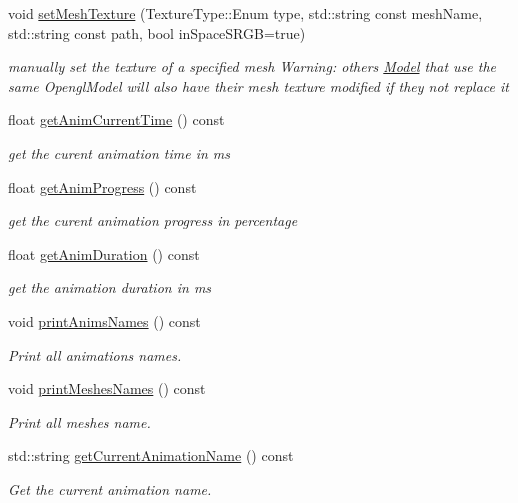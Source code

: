 \begin{DoxyCompactItemize}
void \hyperlink{class_model_a5480a7b5f1dc9381eaee747bca2272a9}{set\+Mesh\+Texture} (Texture\+Type\+::\+Enum type, std\+::string const mesh\+Name, std\+::string const path, bool in\+Space\+S\+R\+GB=true)
\begin{DoxyCompactList}\small\item\em manually set the texture of a specified mesh Warning\+: others \hyperlink{class_model}{Model} that use the same Opengl\+Model will also have their mesh texture modified if they not replace it \end{DoxyCompactList}\item 
float \hyperlink{class_model_ae580b0f51abec662e2617d25760e7d75}{get\+Anim\+Current\+Time} () const
\begin{DoxyCompactList}\small\item\em get the curent animation time in ms \end{DoxyCompactList}\item 
float \hyperlink{class_model_a3bebb9e7811f62ab1b85a5bf02a8a102}{get\+Anim\+Progress} () const
\begin{DoxyCompactList}\small\item\em get the curent animation progress in percentage \end{DoxyCompactList}\item 
float \hyperlink{class_model_abcb280fcf613565f8381688b73c7645c}{get\+Anim\+Duration} () const
\begin{DoxyCompactList}\small\item\em get the animation duration in ms \end{DoxyCompactList}\item 
\mbox{\label{class_model_a5f53c0235f2c92b75e317db3d878e222}} 
void \hyperlink{class_model_a5f53c0235f2c92b75e317db3d878e222}{print\+Anims\+Names} () const
\begin{DoxyCompactList}\small\item\em Print all animations names. \end{DoxyCompactList}\item 
\mbox{\label{class_model_ac0e17dcd9523b9a579431205126e4403}} 
void \hyperlink{class_model_ac0e17dcd9523b9a579431205126e4403}{print\+Meshes\+Names} () const
\begin{DoxyCompactList}\small\item\em Print all meshes name. \end{DoxyCompactList}\item 
std\+::string \hyperlink{class_model_aefd911e07fa22f4b397057185b5aba1b}{get\+Current\+Animation\+Name} () const
\begin{DoxyCompactList}\small\item\em Get the current animation name. \end{DoxyCompactList}\end{DoxyCompactItemize}
